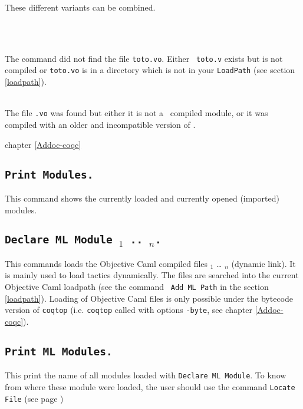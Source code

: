 These different variants can be combined.

\begin{ErrMsgs}
\item {}\\
\item {}\\
  The command did not find the file {\tt toto.vo}. Either {\tt
    toto.v} exists but is not compiled or {\tt toto.vo} is in a directory
  which is not in your {\tt LoadPath} (see section \ref{loadpath}).
\item {}\\
  The file {\tt{\ident}.vo} was found but either it is not a \Coq\
  compiled module, or it was compiled with an older and incompatible
  version of \Coq.
\end{ErrMsgs}

\SeeAlso chapter \ref{Addoc-coqc}

\subsection{\tt Print Modules.}
This command shows the currently loaded and currently opened
(imported) modules.

\subsection{\tt Declare ML Module {\str$_1$} .. {\str$_n$}.}
This commands loads the Objective Caml compiled files {\str$_1$} \dots
{\str$_n$} (dynamic link). It is mainly used to load tactics
dynamically.
 The files are
searched into the current Objective Caml loadpath (see the command {\tt
Add ML Path} in the section \ref{loadpath}).  Loading of Objective Caml
files is only possible under the bytecode version of {\tt coqtop}
(i.e. {\tt coqtop} called with options {\tt -byte}, see chapter 
\ref{Addoc-coqc}).
\begin{ErrMsgs}
\item {}
\item {}
\end{ErrMsgs}

\subsection{\tt Print ML Modules.}
This print the name of all \ocaml{} modules loaded with \texttt{Declare
  ML Module}. To know from where these module were loaded, the user
should use the command \texttt{Locate File} (see page \pageref{Locate File})

